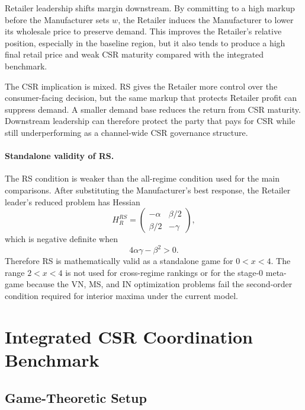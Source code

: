 Retailer leadership shifts margin downstream. By committing to a high markup before the Manufacturer sets $w$, the Retailer induces the Manufacturer to lower its wholesale price to preserve demand. This improves the Retailer's relative position, especially in the baseline region, but it also tends to produce a high final retail price and weak CSR maturity compared with the integrated benchmark.

The CSR implication is mixed. RS gives the Retailer more control over the consumer-facing decision, but the same markup that protects Retailer profit can suppress demand. A smaller demand base reduces the return from CSR maturity. Downstream leadership can therefore protect the party that pays for CSR while still underperforming as a channel-wide CSR governance structure.

\paragraph{Standalone validity of RS.}
The RS condition is weaker than the all-regime condition used for the main comparisons. After substituting the Manufacturer's best response, the Retailer leader's reduced problem has Hessian
\begin{equation*}
    H_R^{RS}=\begin{pmatrix}
        -\alpha & \beta/2\\
        \beta/2 & -\gamma
    \end{pmatrix},
\end{equation*}
which is negative definite when
\begin{equation*}
    4\alpha\gamma-\beta^2>0.
\end{equation*}
Therefore RS is mathematically valid as a standalone game for $0<x<4$. The range $2<x<4$ is not used for cross-regime rankings or for the stage-0 meta-game because the VN, MS, and IN optimization problems fail the second-order condition required for interior maxima under the current model.

\section{Integrated CSR Coordination Benchmark}
\label{sec:in}

\subsection{Game-Theoretic Setup}

